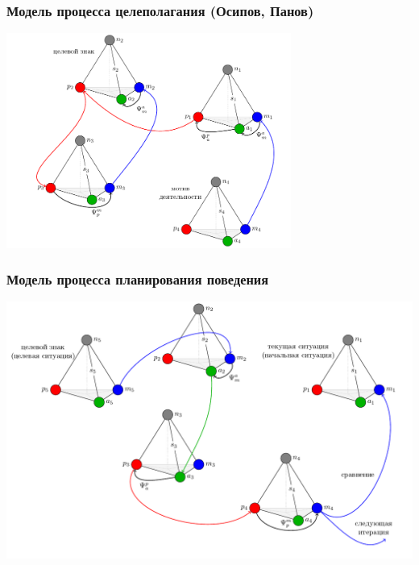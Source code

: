 \documentclass[default]{beamer}
\begin{document}
	\begin{frame}
		\frametitle{Модель процесса целеполагания \footnotesize (Осипов, Панов)}
		\centering
		\includegraphics[width=0.7\textwidth]{algo/ru/goal_set_alg_ru}
	\end{frame}	
	
	\begin{frame}
		\frametitle{Модель процесса планирования поведения}
		\centering
		\includegraphics[width=\textwidth]{algo/ru/plan_alg_ru}
	\end{frame}	
		
\end{document}
